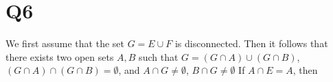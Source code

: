 \documentclass[12pt]{article}
\begin{document}
\section{Q6}
We first assume that the set $G = E \cup F$ is disconnected. Then it follows that there exists two open sets $A,B$ such that $G = (G \cap A) \cup (G \cap B)$, $ (G \cap A) \cap (G \cap B) = \emptyset$, and $A \cap G \not = \emptyset$, $B \cap G \not = \emptyset$
\newline
If $A \cap E = A$, then  
\end{document}

